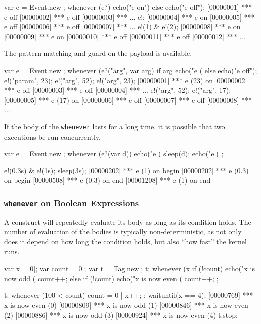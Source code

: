 \begin{urbiunchecked}[firstnumber=1]
var e = Event.new|;
whenever (e?)
  echo("e on")
else
  echo("e off");
[00000001] *** e off
[00000002] *** e off
[00000003] *** ...
e!;
[00000004] *** e on
[00000005] *** e off
[00000006] *** e off
[00000007] *** ...
e!(1) & e!(2);
[00000008] *** e on
[00000009] *** e on
[00000010] *** e off
[00000011] *** e off
[00000012] *** ...
\end{urbiunchecked}

The pattern-matching and guard on the payload is available.

\begin{urbiunchecked}[firstnumber=1]
var e = Event.new|;
whenever (e?("arg", var arg) if arg %
  echo("e (%
else
  echo("e off");
e!("param", 23);
e!("arg", 52);
e!("arg", 23);
[00000001] *** e (23) on
[00000002] *** e off
[00000003] *** e off
[00000004] *** ...
e!("arg", 52);
e!("arg", 17);
[00000005] *** e (17) on
[00000006] *** e off
[00000007] *** e off
[00000008] *** ...
\end{urbiunchecked}


If the body of the \lstinline|whenever| lasts for a long time, it is
possible that two executions be run concurrently.

\begin{urbiscript}[firstnumber=1]
var e = Event.new|;
whenever (e?(var d))
{
  echo("e (%
  sleep(d);
  echo("e (%
};

e!(0.3s) & e!(1s);
sleep(3s);
[00000202] *** e (1) on begin
[00000202] *** e (0.3) on begin
[00000508] *** e (0.3) on end
[00001208] *** e (1) on end
\end{urbiscript}

\subsubsection{\lstinline'whenever' on Boolean Expressions}

A  construct will repeatedly evaluate its body as long as
its condition holds.  The number of evaluation of the bodies is typically
non-deterministic, as not only does it depend on how long the condition
holds, but also ``how fast'' the \urbi kernel runs.

\begin{urbiscript}[firstnumber=1]
var x = 0|;
var count = 0|;
var t = Tag.new|;
t:
  whenever (x %
  {
    if (!count)
      echo("x is now odd (%
    count++;
  }
  else
  {
    if (!count)
      echo("x is now even (%
    count++;
  };

t:
  whenever (100 < count)
  {
    count = 0 |
    x++;
  };
waituntil(x == 4);
[00000769] *** x is now even (0)
[00000809] *** x is now odd (1)
[00000846] *** x is now even (2)
[00000886] *** x is now odd (3)
[00000924] *** x is now even (4)
t.stop;
\end{urbiscript}



